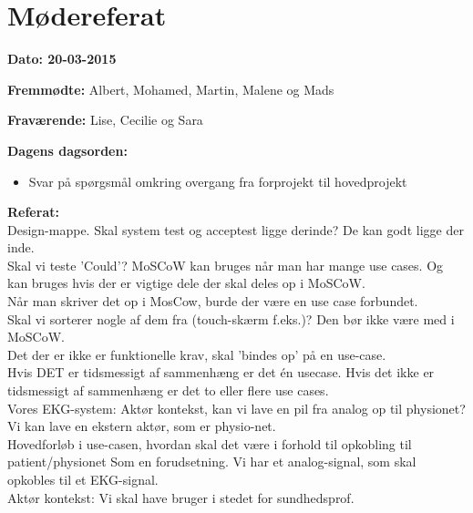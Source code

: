 \chapter{Mødereferat}

\textbf{Dato: 20-03-2015} 

\textbf{Fremmødte:} Albert, Mohamed, Martin, Malene og Mads 

\textbf{Fraværende:} Lise, Cecilie og Sara

\textbf{Dagens dagsorden:}
\begin{itemize}
	\item Svar på spørgsmål omkring overgang fra forprojekt til hovedprojekt
\end{itemize}

\textbf{Referat: }\\ 
Design-mappe. Skal system test og acceptest ligge derinde?
De kan godt ligge der inde. \\
Skal vi teste ’Could’? 
MoSCoW kan bruges når man har mange use cases. Og kan bruges hvis der er vigtige dele der skal deles op i MoSCoW.
\\
Når man skriver det op i MosCow, burde der være en use case forbundet. 
\\
Skal vi sorterer nogle af dem fra (touch-skærm f.eks.)?
Den bør ikke være med i MoSCoW.
\\
Det der er ikke er funktionelle krav, skal ’bindes op’ på en use-case.
\\
Hvis DET er tidsmessigt af sammenhæng er det én usecase.
Hvis det ikke er tidsmessigt af sammenhæng er det to eller flere use cases.
\\
Vores EKG-system:
Aktør kontekst, kan vi lave en pil fra analog op til physionet?
Vi kan lave en ekstern aktør, som er physio-net.
\\
Hovedforløb i use-casen, hvordan skal det være i forhold til opkobling til patient/physionet
Som en forudsetning. 
Vi har et analog-signal, som skal opkobles til et EKG-signal.
\\
Aktør kontekst:
Vi skal have bruger i stedet for sundhedsprof.
